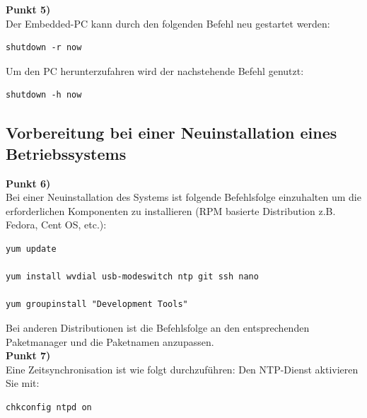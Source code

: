 \documentclass[fontsize = 12pt, paper = a4]{scrreprt}
\begin{document}
\textbf{Punkt 5)} \\
	
Der Embedded-PC kann durch den folgenden Befehl neu gestartet werden:

\vspace*{4mm}
\begin{lstlisting}[frame=single]
shutdown -r now
\end{lstlisting} 
\vspace*{-2mm}

Um den PC herunterzufahren wird der nachstehende Befehl genutzt:

\vspace*{4mm}
\begin{lstlisting}[frame=single]
shutdown -h now	
\end{lstlisting} 
\vspace*{-2mm}

\newpage

\subsection{Vorbereitung bei einer Neuinstallation eines Betriebssystems}

\textbf{Punkt 6)} \\

Bei einer Neuinstallation des Systems ist folgende Befehlsfolge einzuhalten um die erforderlichen Komponenten zu installieren (RPM basierte Distribution z.B. Fedora, Cent OS, etc.):

\vspace*{4mm}
\begin{lstlisting}[frame=single]
yum update

yum install wvdial usb-modeswitch ntp git ssh nano

yum groupinstall "Development Tools"
\end{lstlisting} 
\vspace*{-2mm}

Bei anderen Distributionen ist die Befehlsfolge an den entsprechenden Paketmanager und die Paketnamen anzupassen. \\

\textbf{Punkt 7)} \\

Eine Zeitsynchronisation ist wie folgt durchzuführen:
Den NTP-Dienst aktivieren Sie mit: 

\vspace*{4mm}
\begin{lstlisting}[frame=single]
chkconfig ntpd on
\end{lstlisting} 
\vspace*{-2mm}
\end{document}
